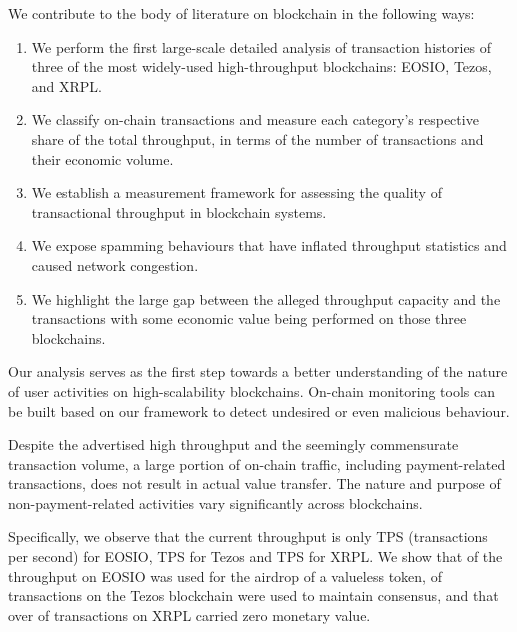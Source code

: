 We contribute to the body of literature on blockchain in the following ways:
\begin{enumerate}%
	\item We perform the first large-scale detailed analysis of transaction histories of three of the most widely-used high-throughput blockchains: EOSIO, Tezos, and XRPL.

	\item We classify on-chain transactions and measure each category's respective share of the total throughput, in terms of the number of transactions and their economic volume.

	\item We establish a measurement framework for assessing the quality of transactional throughput in blockchain systems.

	\item We expose spamming behaviours that have inflated throughput statistics and caused network congestion.

	\item We highlight the large gap between the alleged throughput capacity and the transactions with some economic value being performed on those three blockchains.
\end{enumerate}
%
Our analysis serves as the first step towards a better understanding of the nature of user activities on high-scalability blockchains. On-chain monitoring tools can be built based on our framework to detect undesired or even malicious behaviour.

Despite the advertised high throughput and the seemingly commensurate transaction volume, a large portion of on-chain traffic, including payment-related transactions, does not result in actual value transfer.
The nature and purpose of non-payment-related activities vary significantly across blockchains.

Specifically, we observe that the current throughput is only TPS (transactions per second) for EOSIO,  TPS for Tezos and  TPS for XRPL.
We show that  of the throughput on EOSIO was used for the airdrop of a valueless token,  of transactions on the Tezos blockchain were used to maintain consensus,
and that over  of transactions on XRPL carried zero monetary value.
